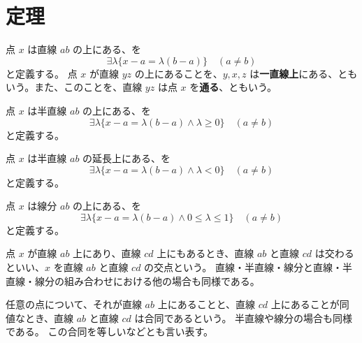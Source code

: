 \chapter{定理}



\begin{dfn}
  点 \(x\) は直線 \(ab\) の上にある、を
  \[\exists\lambda\{x-a=\lambda(b-a)\} \quad (a\neq b)\]
  と定義する。
  点 \(x\) が直線 \(yz\) の上にあることを、\(y,x,z\) は\textbf{一直線上}にある、ともいう。また、このことを、直線 \(yz\) は点 \(x\) を\textbf{通る}、ともいう。
\end{dfn}


\begin{dfn}
  点 \(x\) は半直線 \(ab\) の上にある、を
  \[\exists\lambda\{x-a=\lambda(b-a)\land\lambda\geq 0\} \quad (a\neq b)\]
  と定義する。
\end{dfn}


\begin{dfn}
  点 \(x\) は半直線 \(ab\) の延長上にある、を
  \[\exists\lambda\{x-a=\lambda(b-a)\land\lambda<0\} \quad (a\neq b)\]
  と定義する。
\end{dfn}


\begin{dfn}
  点 \(x\) は線分 \(ab\) の上にある、を
  \[\exists\lambda\{x-a=\lambda(b-a)\land0\leq\lambda\leq 1\} \quad (a\neq b)\]
  と定義する。
\end{dfn}


\begin{dfn}
  点 \(x\) が直線 \(ab\) 上にあり、直線 \(cd\) 上にもあるとき、直線 \(ab\) と直線 \(cd\) は交わるといい、\(x\) を直線 \(ab\) と直線 \(cd\) の交点という。
  直線・半直線・線分と直線・半直線・線分の組み合わせにおける他の場合も同様である。
\end{dfn}


\begin{dfn}
  任意の点について、それが直線 \(ab\) 上にあることと、直線 \(cd\) 上にあることが同値なとき、直線 \(ab\) と直線 \(cd\) は合同であるという。
  半直線や線分の場合も同様である。
  この合同を等しいなどとも言い表す。
\end{dfn}

